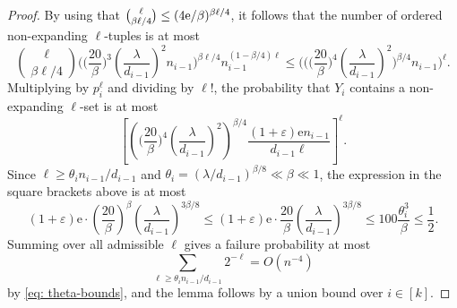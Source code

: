 \documentclass[10pt,a4paper]{amsart}
\newcommand{\e}{\mathrm{e}}
\newcommand{\eps}{\varepsilon}
\begin{document}
\begin{proof}
By using that $\tbinom{\ell}{\beta\ell/4}\le (4\e/\beta)^{\beta\ell/4}$, it follows that the number of ordered non-expanding $\ell$-tuples is at most
\[
    \binom{\ell}{\beta\ell/4}
    \bigg(\bigg(\frac{20}{\beta}\bigg)^3\left(\frac{\lambda}{d_{i-1}}\right)^2n_{i-1}\bigg)^{\beta\ell/4}
    n_{i-1}^{(1-\beta/4)\ell}
    \le
    \bigg(\bigg(\bigg(\frac{20}{\beta}\bigg)^4\left(\frac{\lambda}{d_{i-1}}\right)^2\bigg)^{\beta/4}n_{i-1}\bigg)^\ell.
\]
Multiplying by $p_i^{\ell}$
and dividing by $\ell!$, the probability that $Y_i$ contains a non-expanding $\ell$-set is at most
\[
    \left[
    \left(\bigg(\frac{20}{\beta}\bigg)^4\left(\frac{\lambda}{d_{i-1}}\right)^2\right)^{\beta/4}
    \frac{(1+\eps)\e n_{i-1}}{d_{i-1}\ell}
    \right]^\ell.
\]
Since $\ell\ge\theta_i n_{i-1}/d_{i-1}$ and $\theta_i=(\lambda/d_{i-1})^{\beta/8}\ll \beta\ll 1$, the expression in the square brackets above is at most
\[
    (1+\eps)\e\cdot \left(\frac{20}{\beta}\right)^\beta \left(\frac{\lambda}{d_{i-1}}\right)^{3\beta/8}\le (1+\eps)\e\cdot \frac{20}{\beta} \left(\frac{\lambda}{d_{i-1}}\right)^{3\beta/8}\le 100 \frac{\theta_i^3}{\beta}\le \frac{1}{2}.
\]
Summing over all admissible $\ell$ gives a failure probability at most
\[
    \sum_{\ell\ge \theta_i n_{i-1}/d_{i-1}}2^{-\ell}=O(n^{-4})
\]
by \eqref{eq: theta-bounds}, and the lemma follows by a union bound over $i\in [k]$.
\end{proof}
\end{document}
